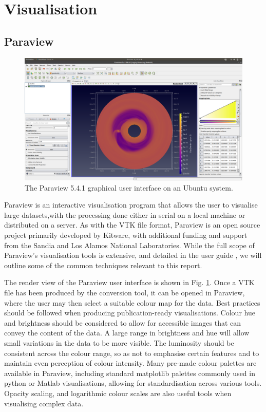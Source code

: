 \documentclass[preprint2]{aastex62}
\begin{document}
\section{Visualisation}
\subsection{Paraview}
\begin{figure}
	\includegraphics[width=\linewidth]{figures/Presentation/paraview.png}
	\caption{\label{fig:pviewinter}The Paraview 5.4.1 graphical user interface on an Ubuntu system.}
\end{figure}
Paraview is an interactive visualisation program that allows the user to visualise large datasets,with the processing done either in serial on a local machine or distributed on a server.
As with the VTK file format, Paraview is an open source project primarily developed by Kitware, with additional funding and support from the Sandia and Los Alamos National Laboratories.
While the full scope of Paraview's visualisation tools is extensive, and detailed in the user guide \cite{para}, we will outline some of the common techniques relevant to this report.

The render view of the Paraview user interface is shown in Fig. \ref{fig:pviewinter}.
Once a VTK file has been produced by the conversion tool, it can be opened in Paraview, where the user may then select a suitable colour map for the data. 
Best practices should be followed when producing publication-ready visualisations. Colour hue and brightness should be considered to allow for accessible images that can convey the content of the data. A large range in brightness and hue will allow small variations in the data to be more visible. 
The luminosity should be consistent across the colour range, so as not to emphasise certain features and to maintain even perception of colour intensity. 
Many pre-made colour palettes are available in Paraview, including standard matplotlib palettes commonly used in python or Matlab visualisations, allowing for standardisation across various tools.
Opacity scaling, and logarithmic colour scales are also useful tools when visualising complex data.
\end{document}
